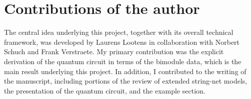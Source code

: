 \section{Contributions of the author}
The central idea underlying this project, together with its overall technical framework, was developed by Laurens Lootens in collaboration with Norbert Schuch and Frank Verstraete. My primary contribution was the explicit derivation of the quantum circuit in terms of the bimodule data, which is the main result underlying this project. In addition, I contributed to the writing of the manuscript, including portions of the review of extended string-net models, the presentation of the quantum circuit, and the example section.
%
